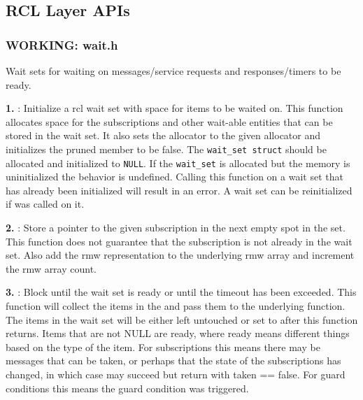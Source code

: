\subsection{RCL Layer APIs}
\subsubsection{WORKING: wait.h}
Wait sets for waiting on messages/service requests and responses/timers to be ready.

\textbf{1. }: Initialize a rcl wait set with space for items to be waited on. This function allocates space for the subscriptions and other wait-able entities that can be stored in the wait set. It also sets the allocator to the given allocator and initializes the pruned member to be false. The \texttt{wait\_set struct} should be allocated and initialized to \texttt{NULL}. If the \texttt{wait\_set} is allocated but the memory is uninitialized the behavior is undefined. Calling this function on a wait set that has already been initialized will result in an error. A wait set can be reinitialized if  was called on it.

\textbf{2. }: Store a pointer to the given subscription in the next empty spot in the set. This function does not guarantee that the subscription is not already in the wait set. Also add the rmw representation to the underlying rmw array and increment the rmw array count.

\textbf{3. }: Block until the wait set is ready or until the timeout has been exceeded. This function will collect the items in the  and pass them to the underlying  function. The items in the wait set will be either left untouched or set to  after this function returns. Items that are not NULL are ready, where ready means different things based on the type of the item. For subscriptions this means there may be messages that can be taken, or perhaps that the state of the subscriptions has changed, in which case  may succeed but return with taken == false. For guard conditions this means the guard condition was triggered.








